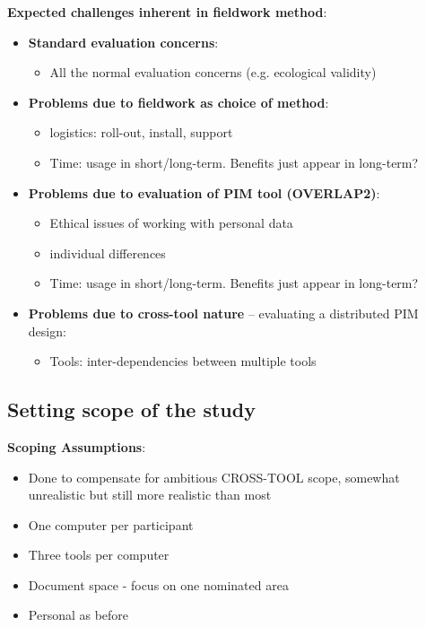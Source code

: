 \textbf{Expected challenges inherent in fieldwork method}:
\begin{itemize}

	\item \textbf{Standard evaluation concerns}:
	\begin{itemize}
		\item 	All the normal evaluation concerns (e.g. ecological validity)
	\end{itemize}

	\item \textbf{Problems due to fieldwork as choice of method}:
	\begin{itemize}
		\item logistics: roll-out, install, support
		\item Time: usage in short/long-term. Benefits just appear in long-term?
	\end{itemize}

	\item \textbf{Problems due to evaluation of PIM tool (OVERLAP2)}:
	\begin{itemize}
		\item Ethical issues of working with personal data
		\item individual differences
		\item Time: usage in short/long-term. Benefits just appear in long-term?
	\end{itemize}
		
	\item \textbf{Problems due to cross-tool nature} -- evaluating a distributed PIM design:
	\begin{itemize}
		\item Tools: inter-dependencies between multiple tools
	\end{itemize}
		
\end{itemize}


\subsection{Setting scope of the study}

\textbf{Scoping Assumptions}:
\begin{itemize}
	\item Done to compensate for ambitious CROSS-TOOL scope, somewhat unrealistic but still more realistic than most
	\item One computer per participant
	\item Three tools per computer
	\item Document space - focus on one nominated area
	\item Personal as before
\end{itemize}
	
